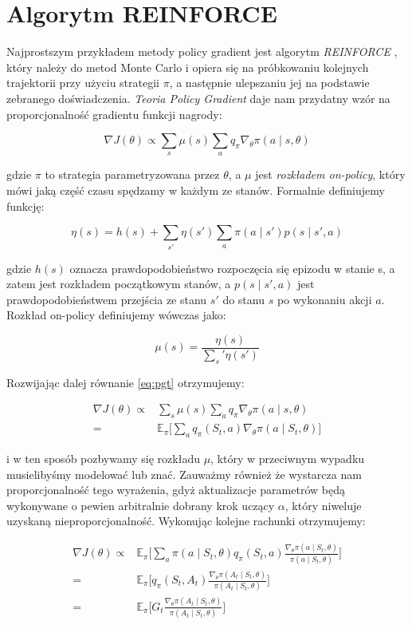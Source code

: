 \documentclass[licencjacka]{pracamgr}
\begin{document}
\section{Algorytm REINFORCE}

Najprostszym przykładem metody policy gradient jest algorytm \emph{REINFORCE} \cite{reinforce}, który należy do metod Monte Carlo i opiera się na próbkowaniu kolejnych trajektorii przy użyciu strategii $\pi$, a następnie ulepszaniu jej na podstawie zebranego doświadczenia. \emph{Teoria Policy Gradient} daje nam przydatny wzór na proporcjonalność gradientu funkcji nagrody:

\begin{equation}\label{eq:pgt}
\nabla J(\theta) \propto \sum_s \mu(s) \sum_a q_{\pi} \nabla_{\theta} \pi(a \mid s, \theta)
\end{equation}

gdzie $\pi$ to strategia parametryzowana przez $\theta$, a $\mu$ jest \emph{rozkładem on-policy}, który mówi jaką część czasu spędzamy w każdym ze stanów. Formalnie definiujemy funkcję:

$$ \eta(s) = h(s) + \sum_{s'} \eta(s') \sum_{a} \pi(a \mid s') p(s \mid s', a) $$

gdzie $ h(s) $ oznacza prawdopodobieństwo rozpoczęcia się epizodu w stanie s, a zatem jest rozkładem początkowym stanów, a $p(s \mid s', a) $ jest prawdopodobieństwem przejścia ze stanu $s'$ do stanu $s$ po wykonaniu akcji $a$. Rozkład on-policy definiujemy wówczas jako:

$$ \mu (s) = \frac{\eta(s)}{\sum_s' \eta(s')} $$

Rozwijając dalej równanie \eqref{eq:pgt} otrzymujemy:

\begin{align*}
\nabla J(\theta) \propto & \sum_s \mu(s) \sum_a q_{\pi} \nabla_{\theta} \pi(a \mid s, \theta) \\
= & \mathbb{E}_\pi \Bigg[ \sum_{a} q_\pi (S_t, a) \nabla_\theta \pi(a \mid S_t, \theta) \Bigg]
\end{align*}

i w ten sposób pozbywamy się rozkładu $\mu$, który w przeciwnym wypadku musielibyśmy modelować lub znać. Zauważmy również że wystarcza nam proporcjonalność tego wyrażenia, gdyż aktualizacje parametrów będą wykonywane o pewien arbitralnie dobrany krok uczący $\alpha$, który niweluje uzyskaną nieproporcjonalność. Wykonując kolejne rachunki otrzymujemy: 

\begin{align*}
\nabla J(\theta) \propto  & \mathbb{E}_\pi \Bigg[ \sum_{a} \pi(a \mid S_t, \theta) q_\pi (S_t, a) \frac{\nabla_\theta \pi(a \mid S_t, \theta)}{\pi(a \mid S_t, \theta)} \Bigg] \\
= & \mathbb{E}_\pi \Bigg[ q_\pi(S_t, A_t) \frac{\nabla_\theta \pi(A_t \mid S_t, \theta)}{\pi(A_t \mid S_t, \theta)} \Bigg] \\ 
= & \mathbb{E}_\pi \Bigg[ G_t \frac{\nabla_\theta \pi(A_t \mid S_t, \theta)}{\pi(A_t \mid S_t, \theta)} \Bigg] 
\end{align*}
\end{document}
